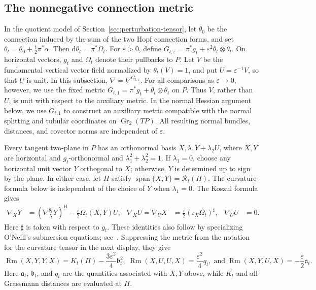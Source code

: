 \documentclass[11pt]{article}
\theoremstyle{definition}
\theoremstyle{remark}
\newcommand{\Gr}{\operatorname{Gr}}
\newcommand{\Rm}{\operatorname{Rm}}
\newcommand{\Span}{\operatorname{span}}
\newcommand{\dd}{\mathrm d}
\newcommand{\eps}{\varepsilon}
\begin{document}
\subsection{The nonnegative connection metric}

In the quotient model of Section~\ref{sec:perturbation-tensor}, let
$\theta_0$ be the connection
induced by the sum of the two Hopf connection forms, and set
$\theta_t=\theta_0+\tfrac t2\pi^*\alpha$.  Then
$\dd\theta_t=\pi^*\Omega_t$.  For $\eps>0$, define
$G_{t,\eps}=\pi^*g_t+\eps^2\theta_t\otimes\theta_t$.
On horizontal vectors, $g_t$ and $\Omega_t$ denote their pullbacks to $P$.
Let $V$ be the fundamental vertical vector field normalized by
$\theta_t(V)=1$, and put $U=\eps^{-1}V$, so that $U$ is unit.
In this subsection, $\nabla=\nabla^{G_{t,\eps}}$.
For all comparisons as $\eps\to0$, however, we use the fixed metric
$G_{t,1}=\pi^*g_t+\theta_t\otimes\theta_t$ on $P$.  Thus
$V$, rather than $U$, is unit with respect to the auxiliary metric.  In the normal Hessian
argument below, we use $G_{t,1}$ to construct an auxiliary metric compatible
with the normal splitting and tubular coordinates on $\Gr_2(TP)$.  All
resulting normal bundles, distances, and covector norms are independent of
$\eps$.

Every tangent two-plane in $P$ has an orthonormal basis
$X,\lambda_1Y+\lambda_2U$, where $X,Y$ are horizontal and
$g_t$-orthonormal and $\lambda_1^2+\lambda_2^2=1$.  If $\lambda_1=0$,
choose any horizontal unit vector $Y$ orthogonal to $X$; otherwise, $Y$ is
determined up to sign by the plane.  In either case, let $\Pi$ satisfy
$\Span\{X,Y\}=\mathcal R_t(\Pi)$.  The curvature formula below is independent
of the choice of $Y$ when $\lambda_1=0$.  The Koszul formula gives
\begin{equation}                                                                    \label{eq:connection-koszul}
 \begin{aligned}
 \nabla_X Y&=(\nabla_X^{g_t}Y)^{\mathrm H}-\frac{\eps}{2}\Omega_t(X,Y)U,
 &\nabla_X U=\nabla_U X&=\frac{\eps}{2}(\iota_X\Omega_t)^\sharp,
 &\nabla_U U&=0.
 \end{aligned}
\end{equation}
Here $\sharp$ is taken with respect to $g_t$.
These identities also follow by specializing O'Neill's submersion equations;
see~\cite[pp.~465--466]{ONeill1966}.  Suppressing the metric from the notation
for the curvature tensor in the next display, they give
\[
 \Rm(X,Y,Y,X)=K_t(\Pi)-\frac{3\eps^2}{4}\mathfrak b_t^2,\;
 \Rm(X,U,U,X)=\frac{\eps^2}{4}q_t,\;\text{and}\;
 \Rm(X,Y,U,X)=-\frac{\eps}{2}\mathfrak a_t.
\]
Here $\mathfrak a_t$, $\mathfrak b_t$, and $q_t$ are the quantities associated
with $X,Y$ above, while $K_t$ and all Grassmann distances are evaluated at
$\Pi$.
\end{document}
